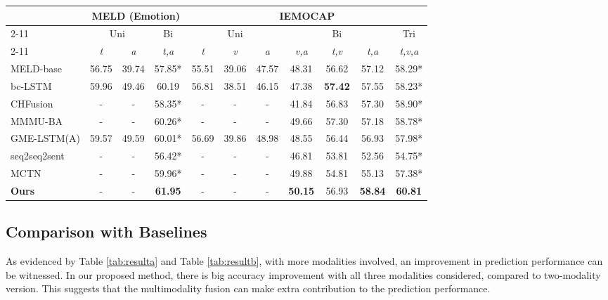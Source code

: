 \documentclass[sigconf]{acmart}
\begin{document}
	\begin{table*}[t]
		\centering
		\caption{Results on IEMOCAP \& MELD (Emotion) \\ * indicates \textit{p-value} < 0.05 for sign test when compared with our method}
		\begin{tabular}{|l|cc|c|ccc|ccc|c|}
		\hline
		\multirow{3}[6]{*}{} & \multicolumn{3}{c|}{MELD (Emotion)} & \multicolumn{7}{c|}{IEMOCAP} \\
	\cline{2-11}          & \multicolumn{2}{c|}{Uni} & Bi    & \multicolumn{3}{c|}{Uni} & \multicolumn{3}{c|}{Bi} & Tri \\
	\cline{2-11}          & \textit{{t}} & \textit{{a}} & \textit{{t,a}} & \textit{{t}} & \textit{{v}} & \textit{{a}} & \textit{{v,a}} & \textit{{t,v}} & \textit{{t,a}} & \textit{{t,v,a}} \\
		\hline
		\hline
		MELD-base & 56.75  & 39.74  & 57.85*  & 55.51     & 39.06     & 47.57     & 48.31     & 56.62     & 57.12     & 58.29* \\
		bc-LSTM & 59.96  & 49.46  & 60.19  & 56.81  & 38.51  & 46.15  & 47.38  & \textbf{57.42 } & 57.55  & 58.23*  \\
		CHFusion & -    & -    & 58.35*  & -    & -    & -    & 41.84  & 56.83  & 57.30  & 58.90*  \\
		MMMU-BA & -    & -    & 60.26*  & -    & -    & -    & 49.66  & 57.30  & 57.18  & 58.78*  \\
		GME-LSTM(A) & 59.57  & 49.59  & 60.01*  & 56.69  & 39.86  & 48.98  & 48.55  & 56.44  & 56.93  & 57.98*  \\
		seq2seq2sent & -    & -    & 56.42*  & -    & -    & -    & 46.81  & 53.81  & 52.56  & 54.75*  \\
		MCTN  & -    & -    & 59.96*  & -    & -    & -    & 49.88  & 54.81  & 55.13  & 57.38*  \\
		\hline
		\textbf{Ours} & -    & -    & \textbf{61.95 } & -    & -    & -    & \textbf{50.15 } & 56.93  & \textbf{58.84 } & \textbf{60.81 } \\
		\hline	  
		\end{tabular}\label{tab:resultb}\end{table*}\subsection{Comparison with Baselines}
	As evidenced by Table \ref{tab:resulta} and Table \ref{tab:resultb}, with more modalities involved, an improvement in prediction performance can be witnessed. In our proposed method, there is big accuracy improvement with all three modalities considered, compared to two-modality version. This suggests that the multimodality fusion can make extra contribution to the prediction performance.
	
\end{document}
